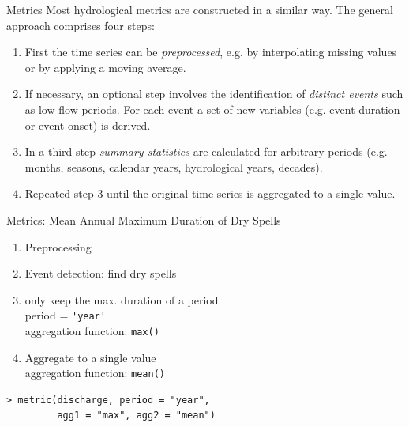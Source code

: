 \documentclass[xetex, german]{beamer}
\begin{document}
\begin{frame}{Metrics}
	Most hydrological metrics are constructed in a similar way. The general approach comprises four steps:
	
	\begin{enumerate}
		\item   First the time series can be \emph{preprocessed}, e.g. by interpolating missing values or by applying a moving average. 
		\item If necessary, an optional step involves the identification of \emph{distinct events} such as low flow periods. For each event a set of new variables (e.g. event duration or event onset) is derived.
		\item  In a third step \emph{summary statistics}  are calculated for arbitrary periods (e.g.  months, seasons, calendar years, hydrological years, decades). 
		\item Repeated step 3 until the original time series is aggregated to a single value. 
	\end{enumerate}
\end{frame}

\begin{frame}[fragile]{Metrics: Mean Annual Maximum Duration of Dry Spells}

	\begin{enumerate}
		\item Preprocessing 
		\item Event detection: find dry spells\\
		
		\item only keep the max. duration of a period\\
		period = \verb|'year'|\\
		aggregation function: \verb|max()|
		\item Aggregate to a single value\\
		aggregation function: \verb|mean()|
	\end{enumerate}
\begin{verbatim}
> metric(discharge, period = "year",
         agg1 = "max", agg2 = "mean")
\end{verbatim}
\end{frame}
\end{document}

